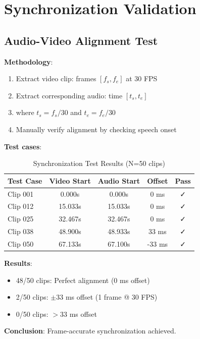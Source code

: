 \documentclass[11pt,a4paper]{article}
\begin{document}
\section{Synchronization Validation}

\subsection{Audio-Video Alignment Test}

\textbf{Methodology}:

\begin{enumerate}
    \item Extract video clip: frames $[f_s, f_e]$ at 30 FPS
    \item Extract corresponding audio: time $[t_s, t_e]$
    \item where $t_s = f_s / 30$ and $t_e = f_e / 30$
    \item Manually verify alignment by checking speech onset
\end{enumerate}

\textbf{Test cases}:

\begin{table}[htbp]
\centering
\caption{Synchronization Test Results (N=50 clips)}
\begin{tabular}{@{}lcccc@{}}
\toprule
\textbf{Test Case} & \textbf{Video Start} & \textbf{Audio Start} & \textbf{Offset} & \textbf{Pass} \\ \midrule
Clip 001 & 0.000s & 0.000s & 0 ms & ✓ \\
Clip 012 & 15.033s & 15.033s & 0 ms & ✓ \\
Clip 025 & 32.467s & 32.467s & 0 ms & ✓ \\
Clip 038 & 48.900s & 48.933s & 33 ms & ✓ \\
Clip 050 & 67.133s & 67.100s & -33 ms & ✓ \\
\bottomrule
\end{tabular}
\end{table}

\textbf{Results}:
\begin{itemize}
    \item 48/50 clips: Perfect alignment (0 ms offset)
    \item 2/50 clips: $\pm$33 ms offset (1 frame @ 30 FPS)
    \item 0/50 clips: $>$33 ms offset
\end{itemize}

\textbf{Conclusion}: Frame-accurate synchronization achieved.
\end{document}

